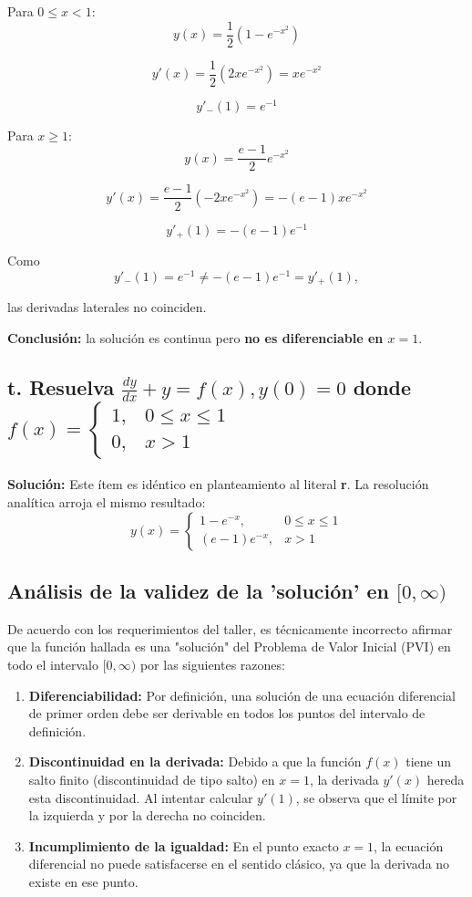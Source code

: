 \documentclass[a4paper]{article}
\begin{document}
Para $0\le x<1$:
$$
y(x)=\frac12(1-e^{-x^2})
$$

$$
y'(x)=\frac12(2x e^{-x^2})=x e^{-x^2}
$$

$$
y'_-(1)=e^{-1}
$$

Para $x\ge 1$:
$$
y(x)=\frac{e-1}{2}e^{-x^2}
$$

$$
y'(x)=\frac{e-1}{2}(-2x e^{-x^2})=-(e-1)x e^{-x^2}
$$

$$
y'_+(1)=-(e-1)e^{-1}
$$

Como
$$
y'_-(1)=e^{-1} \neq -(e-1)e^{-1}=y'_+(1),
$$

las derivadas laterales no coinciden.

\textbf{Conclusión:} la solución es continua pero \textbf{no es diferenciable en $x=1$}.


\subsection*{t. Resuelva $\frac{dy}{dx} + y = f(x), y(0) = 0$ donde $f(x) = \begin{cases} 1, & 0 \le x \le 1 \\ 0, & x > 1 \end{cases}$}

\textbf{Solución:}
Este ítem es idéntico en planteamiento al literal \textbf{r}. La resolución analítica arroja el mismo resultado:
$$y(x) = \begin{cases} 1 - e^{-x}, & 0 \le x \le 1 \\ (e - 1)e^{-x}, & x > 1 \end{cases}$$

\subsection*{Análisis de la validez de la 'solución' en $[0, \infty)$}

De acuerdo con los requerimientos del taller, es técnicamente incorrecto afirmar que la función hallada es una "solución" del Problema de Valor Inicial (PVI) en todo el intervalo $[0, \infty)$ por las siguientes razones:

\begin{enumerate}
    \item \textbf{Diferenciabilidad:} Por definición, una solución de una ecuación diferencial de primer orden debe ser derivable en todos los puntos del intervalo de definición. 
    \item \textbf{Discontinuidad en la derivada:} Debido a que la función $f(x)$ tiene un salto finito (discontinuidad de tipo salto) en $x=1$, la derivada $y'(x)$ hereda esta discontinuidad. Al intentar calcular $y'(1)$, se observa que el límite por la izquierda y por la derecha no coinciden. 
    \item \textbf{Incumplimiento de la igualdad:} En el punto exacto $x=1$, la ecuación diferencial no puede satisfacerse en el sentido clásico, ya que la derivada no existe en ese punto. 
\end{enumerate}
\end{document}

